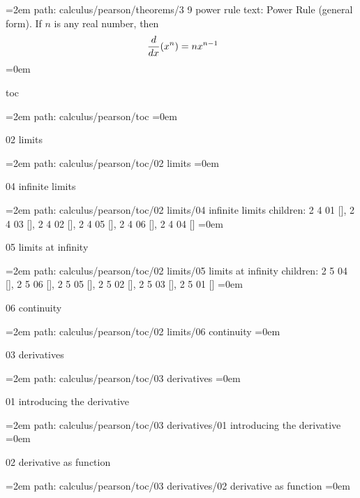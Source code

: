 \par\begingroup
\leftskip=2em
path: calculus/pearson/theorems/3 9 power rule
\smallskip
text:  Power Rule (general form). If $n$ is any real number, then $$\ {d \over dx}(x^n) = nx^{n - 1} $$
\smallskip
\leftskip=0em
\par\endgroup
\bigskip
{}
toc
\smallskip
\par\begingroup
\leftskip=2em
path: calculus/pearson/toc
\smallskip
\leftskip=0em
\par\endgroup
\bigskip
{}
02 limits
\smallskip
\par\begingroup
\leftskip=2em
path: calculus/pearson/toc/02 limits
\smallskip
\leftskip=0em
\par\endgroup
\bigskip
{}
04 infinite limits
\smallskip
\par\begingroup
\leftskip=2em
path: calculus/pearson/toc/02 limits/04 infinite limits
\smallskip
children: 2 4 01 [], 2 4 03 [], 2 4 02 [], 2 4 05 [], 2 4 06 [], 2 4 04 []
\smallskip
\leftskip=0em
\par\endgroup
\bigskip
{}
05 limits at infinity
\smallskip
\par\begingroup
\leftskip=2em
path: calculus/pearson/toc/02 limits/05 limits at infinity
\smallskip
children: 2 5 04 [], 2 5 06 [], 2 5 05 [], 2 5 02 [], 2 5 03 [], 2 5 01 []
\smallskip
\leftskip=0em
\par\endgroup
\bigskip
{}
06 continuity
\smallskip
\par\begingroup
\leftskip=2em
path: calculus/pearson/toc/02 limits/06 continuity
\smallskip
\leftskip=0em
\par\endgroup
\bigskip
{}
03 derivatives
\smallskip
\par\begingroup
\leftskip=2em
path: calculus/pearson/toc/03 derivatives
\smallskip
\leftskip=0em
\par\endgroup
\bigskip
{}
01 introducing the derivative
\smallskip
\par\begingroup
\leftskip=2em
path: calculus/pearson/toc/03 derivatives/01 introducing the derivative
\smallskip
\leftskip=0em
\par\endgroup
\bigskip
{}
02 derivative as function
\smallskip
\par\begingroup
\leftskip=2em
path: calculus/pearson/toc/03 derivatives/02 derivative as function
\smallskip
\leftskip=0em
\par\endgroup
\bigskip
